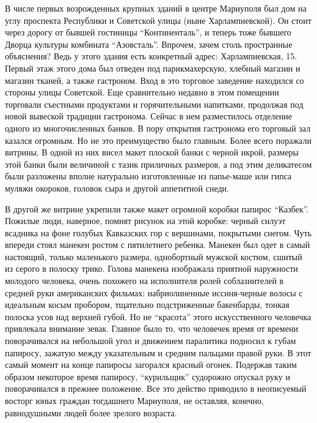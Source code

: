 В числе первых возрожденных крупных зданий в центре Мариуполя был дом на углу
проспекта Республики и Советской улицы (ныне Харлампиевской). Он стоит через
дорогу от бывшей гостиницы \enquote{Континенталь}, и теперь тоже бывшего Дворца
культуры комбината \enquote{Азовсталь}. Впрочем, зачем столь пространные объяснения?
Ведь у этого здания есть конкретный адрес: Харлампиевская, 15. Первый этаж
этого дома был отведен под парикмахерскую, хлебный магазин и магазин тканей, а
также гастроном. Вход в это торговое заведение находился со стороны улицы
Советской. Еще сравнительно недавно в этом помещении торговали съестными
продуктами и горячительными напитками, продолжая под новой вывеской традиции
гастронома. Сейчас в нем разместилось отделение одного из многочисленных
банков. В пору открытия гастронома его торговый зал казался огромным. Но не это
преимущество было главным. Более всего поражали витрины. В одной из них висел
макет плоской банки с черной икрой,   размеры этой банки были величиной с
тазик приличных размеров, а под этим деликатесом были разложены вполне
натурально изготовленные из папье-маше или гипса муляжи окороков, головок сыра
и другой аппетитной снеди.

В другой же витрине укрепили также макет огромной коробки папирос \enquote{Казбек}.
Пожилые люди, наверное, помнят рисунок на этой коробке: черный силуэт всадника
на фоне голубых Кавказских гор с вершинами, покрытыми снегом. Чуть впереди
стоял манекен ростом с пятилетнего ре­бенка. Манекен был одет в самый
настоящий, только маленького размера, однобортный мужской костюм, сшитый из
серого в полоску трико. Голова манекена изображала приятной наружности молодого
человека, очень похожего на исполнителя ролей соблазнителей в средней руки
аме­риканских фильмах: набриолиненные иссиня-черные волосы с идеальным косым
пробором, тщательно подстрижен­ные бакенбарды, тонкая полоска усов над верхней
губой. Но не \enquote{красота} этого искусственного человечка привлекала внимание
зевак. Главное было то, что человечек время от времени поворачивался на
небольшой угол и движе­нием паралитика подносил к губам папиросу, зажатую между
ука­зательным и средним пальцами правой руки. В этот самый момент на конце
папиросы загорался красный огонек. Подержав таким образом некоторое время
папиросу, \enquote{курильщик} судорожно опускал руку и поворачивался в прежнее
положение. Все это действо приводило в неописуемый восторг юных граждан
тогдашнего Мариуполя, не оставляя, конечно, равнодушными людей более зрелого
возраста.

